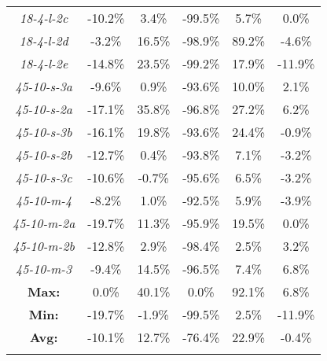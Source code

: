 \begin{table}[htbp!]
\begin{tabular}{cccccc}
\emph{18-4-l-2c}    &   -10.2\%  &   3.4\%    &   -99.5\%  &   5.7\%    &   0.0\%    \\
\emph{18-4-l-2d}    &   -3.2\%   &   16.5\%   &   -98.9\%  &   89.2\%   &   -4.6\%   \\
\emph{18-4-l-2e}    &   -14.8\%  &   23.5\%   &   -99.2\%  &   17.9\%   &   -11.9\%  \\
\emph{45-10-s-3a}   &   -9.6\%   &   0.9\%    &   -93.6\%  &   10.0\%   &   2.1\%    \\
\emph{45-10-s-2a}   &   -17.1\%  &   35.8\%   &   -96.8\%  &   27.2\%   &   6.2\%    \\
\emph{45-10-s-3b}   &   -16.1\%  &   19.8\%   &   -93.6\%  &   24.4\%   &   -0.9\%   \\
\emph{45-10-s-2b}   &   -12.7\%  &   0.4\%    &   -93.8\%  &   7.1\%    &   -3.2\%   \\
\emph{45-10-s-3c}   &   -10.6\%  &   -0.7\%   &   -95.6\%  &   6.5\%    &   -3.2\%   \\
\emph{45-10-m-4}    &   -8.2\%   &   1.0\%    &   -92.5\%  &   5.9\%    &   -3.9\%   \\
\emph{45-10-m-2a}   &   -19.7\%  &   11.3\%   &   -95.9\%  &   19.5\%   &   0.0\%    \\
\emph{45-10-m-2b}   &   -12.8\%  &   2.9\%    &   -98.4\%  &   2.5\%    &   3.2\%    \\
\emph{45-10-m-3}    &   -9.4\%   &   14.5\%   &   -96.5\%  &   7.4\%    &   6.8\%    \\ \hline
\textbf{Max:}   &   0.0\%    &   40.1\%   &   0.0\%    &   92.1\%   &   6.8\%    \\
\textbf{Min:}   &   -19.7\%  &   -1.9\%   &   -99.5\%  &   2.5\%    &   -11.9\%  \\
\textbf{Avg:}   &   -10.1\%  &   12.7\%   &   -76.4\%  &   22.9\%   &   -0.4\%   \\
    \hline
    \label{tab:comparison_of_qualities}
    \end{tabular}
\end{table}